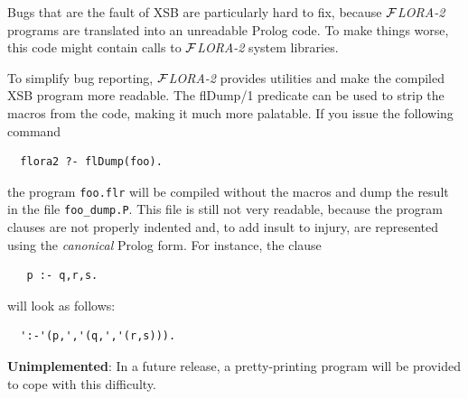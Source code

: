 \documentclass[11pt]{article}
\newcommand{\FLORA}{{\mbox{${\cal F}${\small\it LORA}\rm\emph{-2}}}\xspace}
\begin{document}
Bugs that are the fault of XSB are particularly hard to fix, because
\FLORA programs are translated into an unreadable Prolog code. To make
things worse, this code might contain calls to \FLORA system libraries.

To simplify bug reporting, \FLORA provides utilities and make the compiled
XSB program more readable. The flDump/1 predicate can be used to strip the
macros from the code, making it much more palatable. If you issue the
following command
\begin{verbatim}
  flora2 ?- flDump(foo).  
\end{verbatim}
the program {\tt foo.flr} will be compiled without the macros and dump the
result in the file {\tt foo\_dump.P}. This file is still not very readable,
because the program clauses are not properly indented and, to add insult to
injury, are represented using the \emph{canonical} Prolog form. For
instance, the clause
\begin{verbatim}
   p :- q,r,s.
\end{verbatim}
will look as follows:
\begin{verbatim}
  ':-'(p,','(q,','(r,s))).  
\end{verbatim}
{\bf Unimplemented}: In a future release, a pretty-printing program will be
provided to cope with this difficulty.
\end{document}
